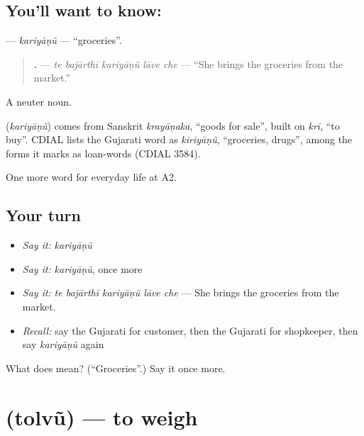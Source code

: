 \subsection*{You'll want to know: }
\textbf{} — \emph{kariyāṇũ} — \textquotedblleft{}groceries\textquotedblright{}.

\begin{quote}
\textbf{    .} — \emph{te bajārthī kariyāṇũ lāve che} — \textquotedblleft{}She brings the groceries from the market.\textquotedblright{}
\end{quote}

A neuter noun.

\begin{cousinweb}
\textbf{} (\emph{kariyāṇũ}) comes from Sanskrit \emph{krayāṇaka}, \textquotedblleft{}goods for sale\textquotedblright{}, built on \emph{krī}, \textquotedblleft{}to buy\textquotedblright{}. CDIAL lists the Gujarati word as \emph{kiriyāṇũ}, \textquotedblleft{}groceries, drugs\textquotedblright{}, among the forms it marks as loan-words (CDIAL 3584).
\end{cousinweb}

\begin{grammarlens}[title={What you've built}]
One more word for everyday life at A2.
\end{grammarlens}

\subsection*{Your turn}
\begin{itemize}
\raggedright
  \item \emph{Say it:} \emph{kariyāṇũ}
  \item \emph{Say it:} \emph{kariyāṇũ}, once more
  \item \emph{Say it:} \emph{te bajārthī kariyāṇũ lāve che} — She brings the groceries from the market.
  \item \emph{Recall:} say the Gujarati for customer, then the Gujarati for shopkeeper, then say \emph{kariyāṇũ} again
\end{itemize}

\begin{tcolorbox}[breakable,colback=teal!4,colframe=teal!35!black,title={Before you move on}]
What does  mean? (\textquotedblleft{}Groceries\textquotedblright{}.) Say it once more.
\end{tcolorbox}
\section[\texorpdfstring{\gu{તોલવું} (tolvũ)}{તોલવું (tolvũ)}]{ (tolvũ) — to weigh}

